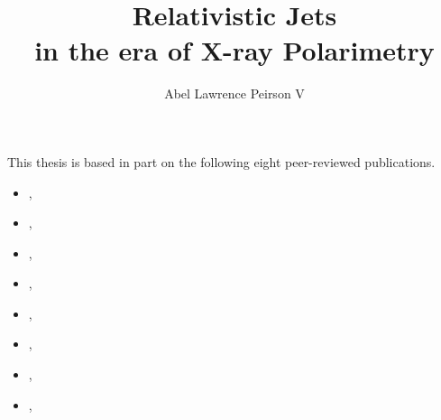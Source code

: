 \title{Relativistic Jets \\ in the era of X-ray Polarimetry}
\author{Abel Lawrence Peirson V}

 
\beforepreface



This thesis is based in part on the following eight peer-reviewed publications. 
\begin{itemize}
    \item \citet{peirson_polarization_2018}, 
    \item \citet{peirson_polarization_2019}, 
    \item \citet{peirson_deep_2021}, 
    \item \citet{peirson_towards_2021}, 
    \item \citet*{liodakis_prospects_2019}, 
    \item \citet{peirson_testing_2022}, 
    \item \citet{peirson_deep_2022}, 
    \item \citet{peirson_neural_2022}, 
\end{itemize}



\afterpreface